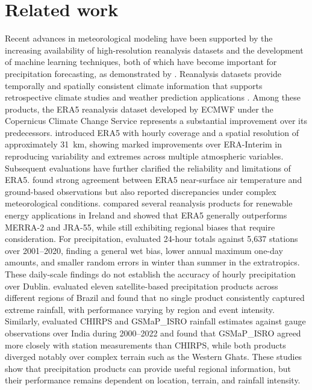 \section{Related work}

Recent advances in meteorological modeling have been supported by the increasing availability of high-resolution reanalysis datasets and the development of machine learning techniques, both of which have become important for precipitation forecasting, as demonstrated by \citet{10512739}. Reanalysis datasets provide temporally and spatially consistent climate information that supports retrospective climate studies and weather prediction applications \citep{10512483}. Among these products, the ERA5 reanalysis dataset developed by ECMWF under the Copernicus Climate Change Service represents a substantial improvement over its predecessors. \citet{hersbach2020era5} introduced ERA5 with hourly coverage and a spatial resolution of approximately 31~km, showing marked improvements over ERA-Interim in reproducing variability and extremes across multiple atmospheric variables. Subsequent evaluations have further clarified the reliability and limitations of ERA5. \citet{mcnicholl2021evaluating} found strong agreement between ERA5 near-surface air temperature and ground-based observations but also reported discrepancies under complex meteorological conditions. \citet{doddy2021reanalysis} compared several reanalysis products for renewable energy applications in Ireland and showed that ERA5 generally outperforms MERRA-2 and JRA-55, while still exhibiting regional biases that require consideration. For precipitation, \citet{lavers2022evaluation} evaluated 24-hour totals against 5,637 stations over 2001--2020, finding a general wet bias, lower annual maximum one-day amounts, and smaller random errors in winter than summer in the extratropics. These daily-scale findings do not establish the accuracy of hourly precipitation over Dublin.  \citet{palharini2021assessment} evaluated eleven satellite-based precipitation products across different regions of Brazil and found that no single product consistently captured extreme rainfall, with performance varying by region and event intensity. Similarly, \citet{kumar2025long} evaluated CHIRPS and GSMaP\_ISRO rainfall estimates against gauge observations over India during 2000--2022 and found that GSMaP\_ISRO agreed more closely with station measurements than CHIRPS, while both products diverged notably over complex terrain such as the Western Ghats. These studies show that precipitation products can provide useful regional information, but their performance remains dependent on location, terrain, and rainfall intensity.

